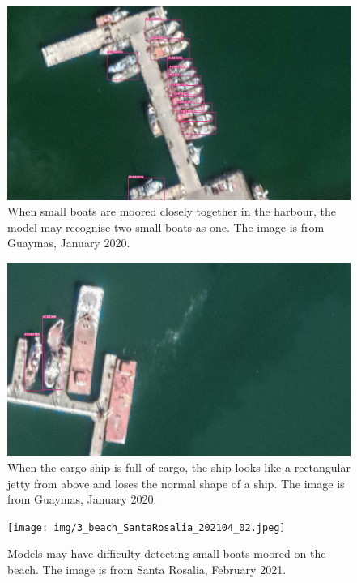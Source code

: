 \begin{figure}[!t]
    \centering
    \includegraphics[width=\columnwidth]{img/1_docked_together_Guaymas_202001_20.jpeg}
    \caption{When small boats are moored closely together in the harbour, the model may recognise two small boats as one. The image is from Guaymas, January 2020.}
    \label{fig:1_docked_together_Guaymas_202001_20}
\end{figure}

\begin{figure}[!t]
    \includegraphics[width=\columnwidth]{img/2_square_Guaymas_202001_01.jpeg}
    \caption{When the cargo ship is full of cargo, the ship looks like a rectangular jetty from above and loses the normal shape of a ship. The image is from Guaymas, January 2020.}
    \label{fig:2_square_Guaymas_202001_01}
\end{figure}

\begin{figure}[!t]
    \texttt{[image: img/3\_beach\_SantaRosalia\_202104\_02.jpeg]}
    \caption{Models may have difficulty detecting small boats moored on the beach. The image is from Santa Rosalia, February 2021.}
    \label{fig:3_beach_SantaRosalia_202104_02}
\end{figure}



